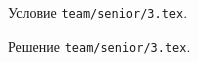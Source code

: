 \problem
Условие \texttt{team/senior/3.tex}.

\solution Решение \texttt{team/senior/3.tex}.
\endproblem
